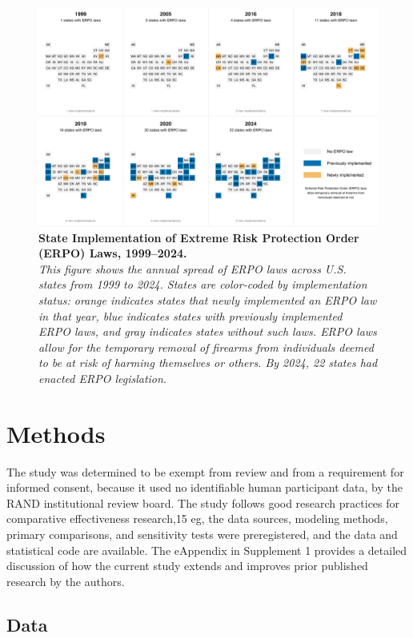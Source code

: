 \documentclass[
  11pt,
]{article}
\begin{document}
\begin{figure}[htbp]
  \centering
  \includegraphics[width=\textwidth]{../erpo_laws_spread.png}
  \caption{
    \textbf{State Implementation of Extreme Risk Protection Order (ERPO) Laws, 1999–2024.}  \\
    \footnotesize\textit{This figure shows the annual spread of ERPO laws across U.S. states from 1999 to 2024. States are color-coded by implementation status: orange indicates states that newly implemented an ERPO law in that year, blue indicates states with previously implemented ERPO laws, and gray indicates states without such laws. ERPO laws allow for the temporary removal of firearms from individuals deemed to be at risk of harming themselves or others. By 2024, 22 states had enacted ERPO legislation.
  }}
  \label{fig:erpo_map}
\end{figure}

\section{Methods}\label{methods}

The study was determined to be exempt from review and from a requirement
for informed consent, because it used no identifiable human participant
data, by the RAND institutional review board. The study follows good
research practices for comparative effectiveness research,15 eg, the
data sources, modeling methods, primary comparisons, and sensitivity
tests were preregistered, and the data and statistical code are
available. The eAppendix in Supplement 1 provides a detailed discussion
of how the current study extends and improves prior published research
by the authors.

\subsection{Data}\label{data}
\end{document}
